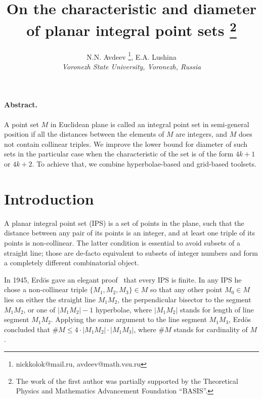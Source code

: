 \documentclass[a4paper,14pt]{article} %
\theoremstyle{plain}
\theoremstyle{definition}
\begin{document}

\title{
	On the characteristic and diameter of planar integral point sets
	\footnote{
		The work of the first author was partially supported by the Theoretical Physics
		and Mathematics Advancement Foundation “BASIS”.
	}
}

\author{
	N.N. Avdeev
	\footnote{nickkolok@mail.ru, avdeev@math.vsu.ru},
	E.A. Lushina
	\\
	\textit{Voronezh State University, Voronezh, Russia}
}


\maketitle

\paragraph{Abstract.}
A point set $M$ in Euclidean plane is called an integral point set in semi-general position if all the distances between the
elements of $M$ are integers, and $M$ does not contain collinear triples.
We improve the lower bound for diameter of such sets in the particular case
when the characteristic of the set is of the form $4k+1$ or $4k+2$.
To achieve that, we combine hyperbolae-based and grid-based toolsets.


\section{Introduction}
	A planar integral point set (IPS) is a set of points in the plane, such that the distance between any pair of its points is an integer, and at least one triple of its points is non-collinear. The latter condition is essential to avoid subsets of a straight line; those are de-facto equivalent to subsets of integer numbers and form a completely different combinatorial object.

	In 1945, Erdös gave an elegant proof~\cite{anning1945integral,erdos1945integral} that every IPS is finite.
	In any IPS he chose a non-collinear triple $\{M_1, M_2, M_3\} \in M$ so that any other point $M_0 \in M$ lies on either the straight line $M_1M_2$, the perpendicular bisector to the segment $M_1M_2$, or one of $|M_1M_2|-1$ hyperbolae, where $|M_1M_2|$ stands for length of line segment $M_1M_2$.  Applying the same argument to the line segment $M_1M_3$, Erdös concluded that $\#M \le 4 \cdot |M_1M_2| \cdot |M_1M_3|$, where $\#M$ stands for cardinality of $M$.
\end{document}
